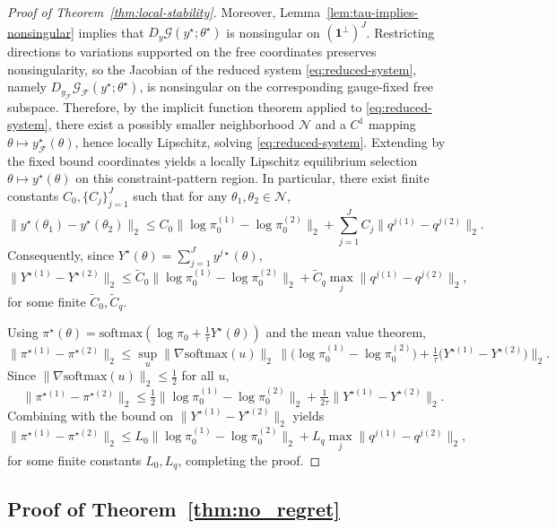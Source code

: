 \documentclass{article}
\begin{document}
\begin{proof}[Proof of Theorem~\ref{thm:local-stability}]
Moreover, Lemma~\ref{lem:tau-implies-nonsingular} implies that
\(D_y\mathcal G(y^\star;\theta^\star)\) is nonsingular on \((\mathbf 1^\perp)^J\).
Restricting directions to variations supported on the free coordinates preserves nonsingularity, so the Jacobian of the reduced
system \eqref{eq:reduced-system}, namely \(D_{y_{\mathcal F}}\mathcal G_{\mathcal F}(y^\star;\theta^\star)\),
is nonsingular on the corresponding gauge-fixed free subspace.
Therefore, by the implicit function theorem applied to \eqref{eq:reduced-system}, there exist a possibly smaller neighborhood
\(\mathcal N\) and a \(C^1\) mapping \(\theta\mapsto y^\star_{\mathcal F}(\theta)\), hence locally Lipschitz, solving
\eqref{eq:reduced-system}. Extending by the fixed bound coordinates yields a locally Lipschitz equilibrium selection
\(\theta\mapsto y^\star(\theta)\) on this constraint-pattern region. In particular, there exist finite constants
\(C_0,\{C_j\}_{j=1}^J\) such that for any \(\theta_1,\theta_2\in\mathcal N\),
\[
\|y^\star(\theta_1)-y^\star(\theta_2)\|_2
\le
C_0\|\log\pi_0^{(1)}-\log\pi_0^{(2)}\|_2
+\sum_{j=1}^J C_j\|q^{j(1)}-q^{j(2)}\|_2.
\]
Consequently, since \(Y^\star(\theta)=\sum_{j=1}^J y^{j\star}(\theta)\),
\[
\|Y^{\star(1)}-Y^{\star(2)}\|_2
\le
\tilde C_0\|\log\pi_0^{(1)}-\log\pi_0^{(2)}\|_2
+\tilde C_q \max_j\|q^{j(1)}-q^{j(2)}\|_2,
\]
for some finite \(\tilde C_0,\tilde C_q\).

Using \(\pi^\star(\theta)=\mathrm{softmax}(\log\pi_0+\tfrac{1}{\tau}Y^\star(\theta))\) and the mean value theorem,
\[
\|\pi^{\star(1)}-\pi^{\star(2)}\|_2
\le
\sup_u \|\nabla \mathrm{softmax}(u)\|_2\,
\Big\|
\big(\log\pi_0^{(1)}-\log\pi_0^{(2)}\big)
+\tfrac{1}{\tau}\big(Y^{\star(1)}-Y^{\star(2)}\big)
\Big\|_2.
\]
Since \(\|\nabla\mathrm{softmax}(u)\|_2\le \tfrac12\) for all \(u\),
\[
\|\pi^{\star(1)}-\pi^{\star(2)}\|_2
\le \tfrac12\|\log\pi_0^{(1)}-\log\pi_0^{(2)}\|_2
+\tfrac{1}{2\tau}\|Y^{\star(1)}-Y^{\star(2)}\|_2.
\]
Combining with the bound on \(\|Y^{\star(1)}-Y^{\star(2)}\|_2\) yields
\[
\|\pi^{\star(1)}-\pi^{\star(2)}\|_2
\le
L_0\|\log\pi_0^{(1)}-\log\pi_0^{(2)}\|_2
+
L_q\max_j\|q^{j(1)}-q^{j(2)}\|_2,
\]
for some finite constants \(L_0,L_q\), completing the proof.
\end{proof}

\subsection{Proof of Theorem~\ref{thm:no_regret}}
\label{proof:no_regret}
\end{document}

